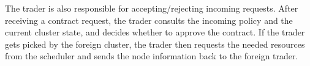 The trader is also responsible for accepting/rejecting incoming requests. After
receiving a contract request, the trader consults the incoming policy and the
current cluster state, and decides whether to approve the contract. If the
trader gets picked by the foreign cluster, the trader then requests the needed
resources from the scheduler and sends the node information back to the foreign
trader.
